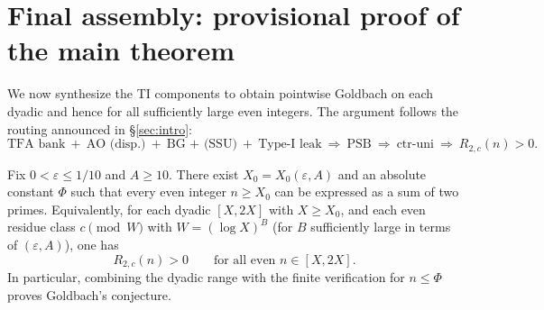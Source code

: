\section{Final assembly: provisional proof of the main theorem}
\label{sec:final-assembly}\label{sec:assembly}

We now synthesize the TI components to obtain pointwise Goldbach on each dyadic and hence for all sufficiently large even integers. The argument follows the routing announced in \S\ref{sec:intro}:
\[
\text{TFA bank}\ +\ \text{AO (disp.)}\ +\ \text{BG + (SSU)}\ +\ \text{Type-I leak}
\ \Longrightarrow\ \text{PSB}
\ \Longrightarrow\ \text{ctr-uni}
\ \Longrightarrow\ R_{2,c}(n)>0.
\]

\begin{theorem}
\label{thm:goldbach-large}
Fix $0<\varepsilon\le 1/10$ and $A\ge 10$. There exist $X_0=X_0(\varepsilon,A)$ and an absolute constant $\Phi$ such that every even integer $n\ge X_0$ can be expressed as a sum of two primes. Equivalently, for each dyadic $[X,2X]$ with $X\ge X_0$, and each even residue class $c\pmod W$ with $W=(\log X)^B$ (for $B$ sufficiently large in terms of $(\varepsilon,A)$), one has
\[
R_{2,c}(n)>0\qquad\text{for all even }n\in[X,2X].
\]
In particular, combining the dyadic range with the finite verification for $n\le \Phi$ proves Goldbach's conjecture.
\end{theorem}


